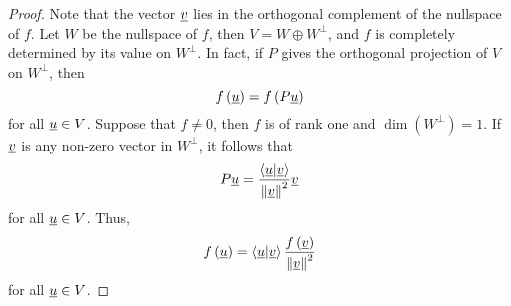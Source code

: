 \begin{proof}
Note that the vector $\underline{v}$ lies in the orthogonal complement of the nullspace of $f$.
Let $W$ be the nullspace of $f$, then $V = W \oplus W^{\bot}$, and $f$ is completely determined by its value on $W^{\bot}$.
In fact, if $P$ gives the orthogonal projection of $V$ on $W^{\bot}$, then
\begin{equation*}
f \left( \underline{u} \right) = f \left( P \underline{u} \right)
\end{equation*}
for all $\underline{u} \in V$.
Suppose that $f \neq 0$, then $f$ is of rank one and $\dim \left( W^{\bot} \right) = 1$.
If $\underline{v}$ is any non-zero vector in $W^{\bot}$, it follows that
\begin{equation*}
P \underline{u} = \frac{ \left\langle \underline{u} | \underline{v} \right\rangle }{ \left\| \underline{v} \right\|^2 } \underline{v}
\end{equation*}
for all $\underline{u} \in V$.
Thus,
\begin{equation*}
f \left( \underline{u} \right) = \left\langle \underline{u} | \underline{v} \right\rangle
\frac{f \left( \underline{v} \right) }{ \left\| \underline{v} \right\|^2 }
\end{equation*}
for all $\underline{u} \in V$.
\fi

\end{proof}
